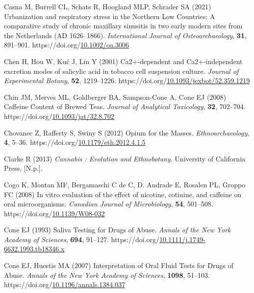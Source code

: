 \documentclass[
  11pt,
  leqno]{scrartcl}
\newlength{\cslhangindent}
\newenvironment{CSLReferences}[2] %
 {\begin{list}{}{%
  \setlength{\itemindent}{0pt}
  \setlength{\leftmargin}{0pt}
  \setlength{\parsep}{0pt}
  \ifodd #1
   \setlength{\leftmargin}{\cslhangindent}
   \setlength{\itemindent}{-1\cslhangindent}
  \fi
  \setlength{\itemsep}{#2\baselineskip}}}
 {\end{list}}
\begin{document}
\begin{CSLReferences}{1}{0}
Casna M, Burrell CL, Schats R, Hoogland MLP, Schrader SA (2021)
Urbanization and respiratory stress in the {Northern Low Countries}: {A}
comparative study of chronic maxillary sinusitis in two early modern
sites from the {Netherlands} ({AD} 1626--1866). \emph{International
Journal of Osteoarchaeology}, \textbf{31}, 891--901.
https://doi.org/\href{https://doi.org/10.1002/oa.3006}{10.1002/oa.3006}

Chen H, Hou W, Kuć J, Lin Y (2001) Ca2+‐dependent and {Ca2}+‐independent
excretion modes of salicylic acid in tobacco cell suspension culture.
\emph{Journal of Experimental Botany}, \textbf{52}, 1219--1226.
https://doi.org/\href{https://doi.org/10.1093/jexbot/52.359.1219}{10.1093/jexbot/52.359.1219}

Chin JM, Merves ML, Goldberger BA, Sampson-Cone A, Cone EJ (2008)
Caffeine {Content} of {Brewed Teas}. \emph{Journal of Analytical
Toxicology}, \textbf{32}, 702--704.
https://doi.org/\href{https://doi.org/10.1093/jat/32.8.702}{10.1093/jat/32.8.702}

Chovanec Z, Rafferty S, Swiny S (2012) Opium for the {Masses}.
\emph{Ethnoarchaeology}, \textbf{4}, 5--36.
https://doi.org/\href{https://doi.org/10.1179/eth.2012.4.1.5}{10.1179/eth.2012.4.1.5}

Clarke R (2013) \emph{Cannabis : {Evolution} and {Ethnobotany}}.
{University of California Press}, {{[}N.p.{]}}.

Cogo K, Montan MF, Bergamaschi C de C, D. Andrade E, Rosalen PL, Groppo
FC (2008) In vitro evaluation of the effect of nicotine, cotinine, and
caffeine on oral microorganisms. \emph{Canadian Journal of
Microbiology}, \textbf{54}, 501--508.
https://doi.org/\href{https://doi.org/10.1139/W08-032}{10.1139/W08-032}

Cone EJ (1993) Saliva {Testing} for {Drugs} of {Abuse}. \emph{Annals of
the New York Academy of Sciences}, \textbf{694}, 91--127.
https://doi.org/\href{https://doi.org/10.1111/j.1749-6632.1993.tb18346.x}{10.1111/j.1749-6632.1993.tb18346.x}

Cone EJ, Huestis MA (2007) Interpretation of {Oral Fluid Tests} for
{Drugs} of {Abuse}. \emph{Annals of the New York Academy of Sciences},
\textbf{1098}, 51--103.
https://doi.org/\href{https://doi.org/10.1196/annals.1384.037}{10.1196/annals.1384.037}


\end{CSLReferences}
\end{document}

